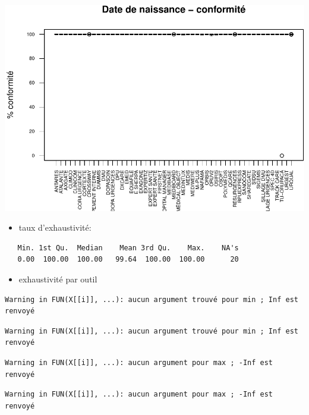 \documentclass[]{article}
\begin{document}
\includegraphics{septembre2015_files/figure-latex/unnamed-chunk-14-1.pdf}

\begin{itemize}
\itemsep1pt\parskip0pt
\item
  taux d'exhaustivité:
\end{itemize}

\begin{verbatim}
   Min. 1st Qu.  Median    Mean 3rd Qu.    Max.    NA's 
   0.00  100.00  100.00   99.64  100.00  100.00      20 
\end{verbatim}

\begin{itemize}
\itemsep1pt\parskip0pt
\item
  exhaustivité par outil
\end{itemize}

\begin{verbatim}
Warning in FUN(X[[i]], ...): aucun argument trouvé pour min ; Inf est
renvoyé
\end{verbatim}

\begin{verbatim}
Warning in FUN(X[[i]], ...): aucun argument trouvé pour min ; Inf est
renvoyé
\end{verbatim}

\begin{verbatim}
Warning in FUN(X[[i]], ...): aucun argument pour max ; -Inf est renvoyé
\end{verbatim}

\begin{verbatim}
Warning in FUN(X[[i]], ...): aucun argument pour max ; -Inf est renvoyé
\end{verbatim}
\end{document}
